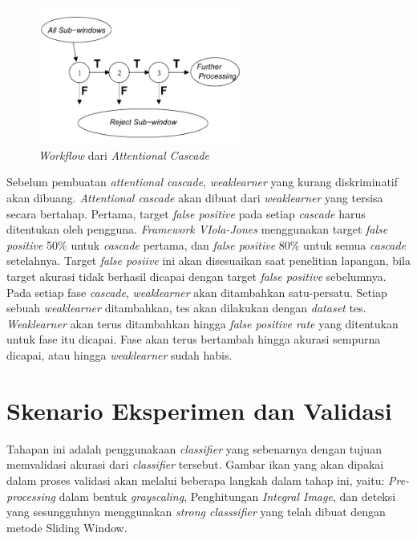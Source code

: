 \begin{figure}[H]
  \centering{}
	\includegraphics[width=0.6\textwidth]{gambar/cascade}
  \caption{\textit{Workflow} dari \emph{Attentional Cascade}}
\end{figure}

Sebelum pembuatan \emph{attentional cascade}, \emph{weaklearner} yang kurang 
diskriminatif akan dibuang. 
\emph{Attentional cascade} akan dibuat dari \emph{weaklearner} 
yang tersisa secara bertahap. 
Pertama, target \textit{false positive} pada setiap \emph{cascade} 
harus ditentukan oleh pengguna. \emph{Framework VIola-Jones} menggunakan target 
\textit{false positive} 50\% untuk \emph{cascade} pertama, dan 
\textit{false positive} 80\% untuk semua \emph{cascade} setelahnya.
Target \textit{false posiive} ini akan disesuaikan 
saat penelitian lapangan, bila target akurasi tidak berhasil dicapai 
dengan target \textit{false positive} sebelumnya.
Pada setiap fase \emph{cascade}, \emph{weaklearner} akan 
ditambahkan satu-persatu. Setiap sebuah \emph{weaklearner} ditambahkan, tes akan dilakukan 
dengan \emph{dataset} tes. \emph{Weaklearner} akan terus ditambahkan hingga \emph{false positive rate} 
yang ditentukan untuk fase itu dicapai. Fase akan terus bertambah hingga 
akurasi sempurna dicapai, atau hingga \emph{weaklearner} sudah habis. 


\section{Skenario Eksperimen dan Validasi}

Tahapan ini adalah penggunakaan \emph{classifier} yang sebenarnya dengan tujuan 
memvalidasi akurasi dari \emph{classifier} tersebut. 
Gambar ikan yang akan dipakai dalam proses validasi akan 
melalui beberapa langkah dalam tahap ini, 
yaitu: \textit{Pre-processing} dalam bentuk \emph{grayscaling}, Penghitungan 
\emph{Integral Image}, dan deteksi yang sesungguhnya menggunakan \emph{strong classsifier} 
yang telah dibuat dengan metode Sliding Window.

